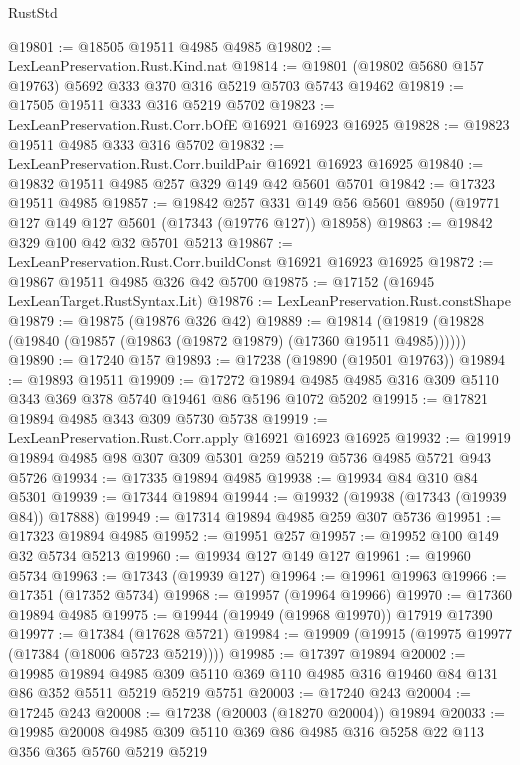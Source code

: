 \begin{lexlean}{RustStd}
\begin{coremodule}
@19801 := @18505 @19511 @4985 @4985
@19802 := LexLeanPreservation.Rust.Kind.nat
@19814 := @19801 (@19802 @5680 @157 @19763) @5692 @333 @370 @316 @5219 @5703 @5743 @19462
@19819 := @17505 @19511 @333 @316 @5219 @5702
@19823 := LexLeanPreservation.Rust.Corr.bOfE @16921 @16923 @16925
@19828 := @19823 @19511 @4985 @333 @316 @5702
@19832 := LexLeanPreservation.Rust.Corr.buildPair @16921 @16923 @16925
@19840 := @19832 @19511 @4985 @257 @329 @149 @42 @5601 @5701
@19842 := @17323 @19511 @4985
@19857 := @19842
    @257
    @331
    @149
    @56
    @5601
    @8950
    (@19771 @127 @149 @127 @5601 (@17343 (@19776 @127)) @18958)
@19863 := @19842 @329 @100 @42 @32 @5701 @5213
@19867 := LexLeanPreservation.Rust.Corr.buildConst @16921 @16923 @16925
@19872 := @19867 @19511 @4985 @326 @42 @5700
@19875 := @17152 (@16945 LexLeanTarget.RustSyntax.Lit)
@19876 := LexLeanPreservation.Rust.constShape
@19879 := @19875 (@19876 @326 @42)
@19889 := @19814 (@19819 (@19828 (@19840 (@19857 (@19863 (@19872 @19879) (@17360 @19511 @4985))))))
@19890 := @17240 @157
@19893 := @17238 (@19890 (@19501 @19763))
@19894 := @19893 @19511
@19909 := @17272
    @19894
    @4985
    @4985
    @316
    @309
    @5110
    @343
    @369
    @378
    @5740
    @19461
    @86
    @5196
    @1072
    @5202
@19915 := @17821 @19894 @4985 @343 @309 @5730 @5738
@19919 := LexLeanPreservation.Rust.Corr.apply @16921 @16923 @16925
@19932 := @19919 @19894 @4985 @98 @307 @309 @5301 @259 @5219 @5736 @4985 @5721 @943 @5726
@19934 := @17335 @19894 @4985
@19938 := @19934 @84 @310 @84 @5301
@19939 := @17344 @19894
@19944 := @19932 (@19938 (@17343 (@19939 @84)) @17888)
@19949 := @17314 @19894 @4985 @259 @307 @5736
@19951 := @17323 @19894 @4985
@19952 := @19951 @257
@19957 := @19952 @100 @149 @32 @5734 @5213
@19960 := @19934 @127 @149 @127
@19961 := @19960 @5734
@19963 := @17343 (@19939 @127)
@19964 := @19961 @19963
@19966 := @17351 (@17352 @5734)
@19968 := @19957 (@19964 @19966)
@19970 := @17360 @19894 @4985
@19975 := @19944 (@19949 (@19968 @19970)) @17919 @17390
@19977 := @17384 (@17628 @5721)
@19984 := @19909 (@19915 (@19975 @19977 (@17384 (@18006 @5723 @5219))))
@19985 := @17397 @19894
@20002 := @19985
    @19894
    @4985
    @309
    @5110
    @369
    @110
    @4985
    @316
    @19460
    @84
    @131
    @86
    @352
    @5511
    @5219
    @5219
    @5751
@20003 := @17240 @243
@20004 := @17245 @243
@20008 := @17238 (@20003 (@18270 @20004)) @19894
@20033 := @19985
    @20008
    @4985
    @309
    @5110
    @369
    @86
    @4985
    @316
    @5258
    @22
    @113
    @356
    @365
    @5760
    @5219
    @5219

\end{coremodule}
\end{lexlean}
